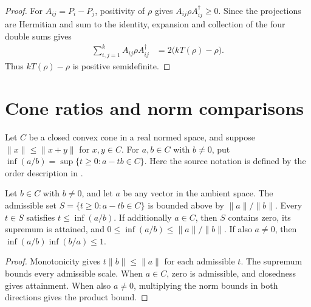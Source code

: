 \begin{proof}\leanok
    For $A_{ij}=P_i-P_j$, positivity of $\rho$ gives
    $A_{ij}\rho A_{ij}^{\dagger}\ge 0$.  Since the projections are
    Hermitian and sum to the identity, expansion and collection of the four
    double sums gives
    \begin{align}
        \sum_{i,j=1}^k A_{ij}\rho A_{ij}^{\dagger}
         & = 2\bigl(kT(\rho)-\rho\bigr).
    \end{align}
    Thus $kT(\rho)-\rho$ is positive semidefinite.
\end{proof}

\section{Cone ratios and norm comparisons}

\begin{definition}
    \label{def:lower_cone_ratio}
    \leanok
    Let $C$ be a closed convex cone in a real normed space, and suppose
    $\|x\|\le\|x+y\|$ for $x,y\in C$. For $a,b\in C$ with $b\ne0$, put
    $\inf(a/b)=\sup\{t\ge0:a-tb\in C\}$.
    Here the source notation is defined by the order description in
    \cite[Chapter~8, Equation~(8.61)]{Wolf2012Quantum}.
\end{definition}

\begin{lemma}
    \label{lem:lower_cone_ratio_bounds}
    \leanok
    Let $b\in C$ with $b\ne0$, and let $a$ be any vector in the ambient space.
    The admissible set $S=\{t\ge0:a-tb\in C\}$ is bounded above by
    $\|a\|/\|b\|$. Every $t\in S$ satisfies $t\le\inf(a/b)$.
    If additionally $a\in C$, then $S$ contains zero, its supremum is attained,
    and $0\le\inf(a/b)\le\|a\|/\|b\|$.
    If also $a\ne0$, then $\inf(a/b)\inf(b/a)\le1$.
\end{lemma}
\begin{proof}\leanok
    Monotonicity gives $t\|b\|\le\|a\|$ for each admissible $t$.
    The supremum bounds every admissible scale. When $a\in C$, zero is
    admissible, and closedness gives attainment. When also $a\ne0$,
    multiplying the norm bounds in both directions gives the product bound.
\end{proof}

